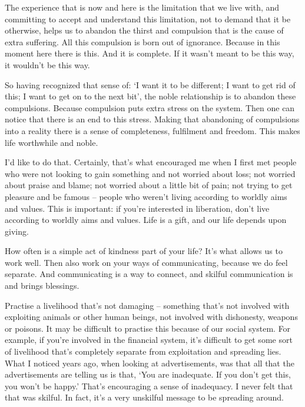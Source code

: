The experience that is now and here is the limitation that we live with, and
committing to accept and understand this limitation, not to demand that it be otherwise, helps
us to abandon the thirst and compulsion that is the cause of extra suffering.
All this compulsion is born out of ignorance. Because in this moment here there is this. And
it is complete. If it wasn't meant to be this way, it wouldn't be this way.

So having recognized that sense of: `I want it to be different; I want to get
rid of this; I want to get on to the next bit', the noble relationship is to
abandon these compulsions. Because compulsion puts extra stress on the system.
Then one can notice that there is an end to this stress. Making that abandoning of compulsions
into a reality there is a sense of completeness, fulfilment and freedom. This
makes life worthwhile and noble.

\enlargethispage{2\baselineskip}

I'd like to do that. Certainly, that's what encouraged me when I first met
people who were not looking to gain something and not worried about loss; not
worried about praise and blame; not worried about a little bit of pain; not
trying to get pleasure and be famous -- people who weren't living according to
worldly aims and values. This is important: if you're interested in liberation,
don't live according to worldly aims and values. Life is a gift, and our life
depends upon giving.

How often is a simple act of kindness part of your life? It's what allows us to
work well. Then also work on your ways of communicating, because we do feel
separate. And communicating is a way to connect, and skilful communication is and brings blessings.

Practise a livelihood that's not damaging -- something that's not
involved with exploiting animals or other human beings, not involved with
dishonesty, weapons or poisons. 
It may be difficult to practise this because of our social system. For example,
if you're involved in the financial system, it's difficult to get some sort of
livelihood that's completely separate from exploitation and spreading lies. What
I noticed years ago, when looking at advertisements, was that all that the
advertisements are telling us is that, `You are inadequate. If you don't get
this, you won't be happy.' That's encouraging a sense of inadequacy. I never
felt that that was skilful. In fact, it's a very unskilful message to be
spreading around. 

